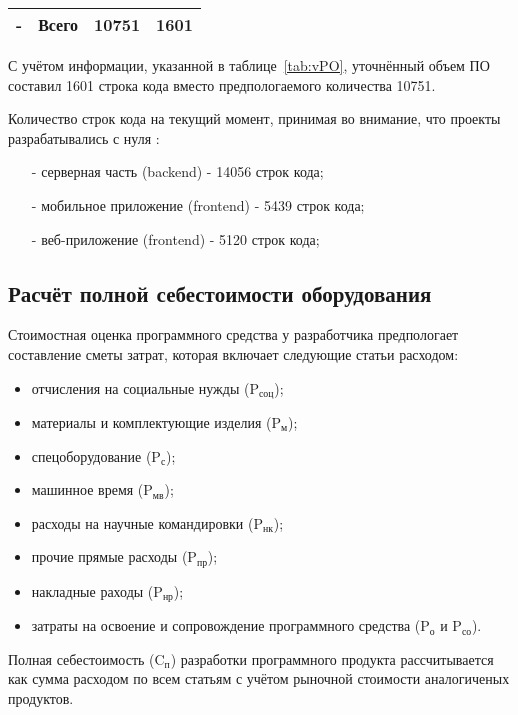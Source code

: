 \begin{table}[h!]
\begin{tabular}{|p{1cm}|p{8.5cm}|p{3cm}|p{3cm}|}
        \multicolumn{1}{|c|}{-}   & Всего                                                   & \multicolumn{1}{r|}{10751}& \multicolumn{1}{r|}{1601} \\ \hline
    \end{tabular}
\end{table}

С учётом информации, указанной в таблице~\ref{tab:vPO}, уточнённый объем ПО составил 1601 строка кода
вместо предпологаемого количества 10751.

Количество строк кода на текущий момент, принимая во внимание, что проекты разрабатывались с нуля \cite{LinuxCloc}:
\begin{enumerate}
    \item[-] серверная часть (backend) - 14056 строк кода;
    \item[-] мобильное приложение (frontend) - 5439 строк кода;
    \item[-] веб-приложение (frontend) - 5120 строк кода;
\end{enumerate}

\subsection{Расчёт полной себестоимости оборудования}

Стоимостная оценка программного средства у разработчика предпологает составление сметы затрат,
которая включает следующие статьи расходом:

\begin{itemize}
    \item отчисления на социальные нужды ($\text{P}_{\text{соц}}$);
    \item материалы и комплектующие изделия ($\text{P}_{\text{м}}$);
    \item спецоборудование ($\text{P}_{\text{с}}$);
    \item машинное время ($\text{P}_{\text{мв}}$);
    \item расходы на научные командировки ($\text{P}_{\text{нк}}$);
    \item прочие прямые расходы ($\text{P}_{\text{пр}}$);
    \item накладные раходы ($\text{P}_{\text{нр}}$);
    \item затраты на освоение и сопровождение программного средства ($\text{P}_{\text{о}}$ и $\text{P}_{\text{со}}$).
\end{itemize}

Полная себестоимость ($\text{C}_{\text{п}}$) разработки программного продукта рассчитывается как сумма расходом
по всем статьям с учётом рыночной стоимости аналогиченых продуктов.

